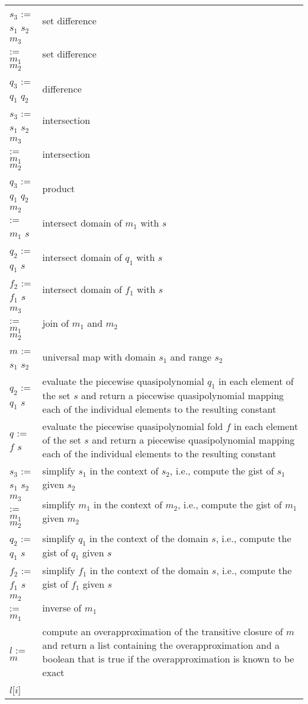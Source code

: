 \begin{supertabular}{lp{0.7\textwidth}}
$s_3$ := $s_1$ \ai{$-$} $s_2$ & set difference
\\
$m_3$ := $m_1$ \ai{$-$} $m_2$ & set difference
\\
$q_3$ := $q_1$ \ai{$-$} $q_2$ & difference
\\
$s_3$ := $s_1$ \ai{$*$} $s_2$ & intersection
\\
$m_3$ := $m_1$ \ai{$*$} $m_2$ & intersection
\\
$q_3$ := $q_1$ \ai{$*$} $q_2$ & product
\\
$m_2$ := $m_1$ \ai{$*$} $s$ & intersect domain of $m_1$ with $s$
\\
$q_2$ := $q_1$ \ai{$*$} $s$ & intersect domain of $q_1$ with $s$
\\
$f_2$ := $f_1$ \ai{$*$} $s$ & intersect domain of $f_1$ with $s$
\\
$m_3$ := $m_1$  $m_2$ & join of $m_1$ and $m_2$
\\
$m$ := $s_1$ \ai[\tt]{->} $s_2$ & universal map with domain $s_1$
and range $s_2$
\\
$q_2$ := $q_1$  $s$ &
evaluate the piecewise quasipolynomial $q_1$ in each element
of the set $s$ and return a piecewise quasipolynomial
mapping each of the individual elements to the resulting
constant
\\
$q$ := $f$  $s$ &
evaluate the piecewise quasipolynomial fold $f$ in each element
of the set $s$ and return a piecewise quasipolynomial
mapping each of the individual elements to the resulting
constant
\\
$s_3$ := $s_1$ \ai[\tt]{\%} $s_2$ &
simplify $s_1$ in the context of $s_2$, i.e., compute
the gist of $s_1$ given $s_2$
\\
$m_3$ := $m_1$ \ai[\tt]{\%} $m_2$ &
simplify $m_1$ in the context of $m_2$, i.e., compute
the gist of $m_1$ given $m_2$
\\
$q_2$ := $q_1$ \ai[\tt]{\%} $s$ &
simplify $q_1$ in the context of the domain $s$, i.e., compute
the gist of $q_1$ given $s$
\\
$f_2$ := $f_1$ \ai[\tt]{\%} $s$ &
simplify $f_1$ in the context of the domain $s$, i.e., compute
the gist of $f_1$ given $s$
\\
$m_2$ := $m_1$ & inverse of $m_1$
\\
$l$ := $m$\ai[\tt]{\^{}+} &
compute an overapproximation of the transitive closure
of $m$ and return a list containing the overapproximation
and a boolean that is true if the overapproximation
is known to be exact
\\
$l$[$i$] &

\end{supertabular}
